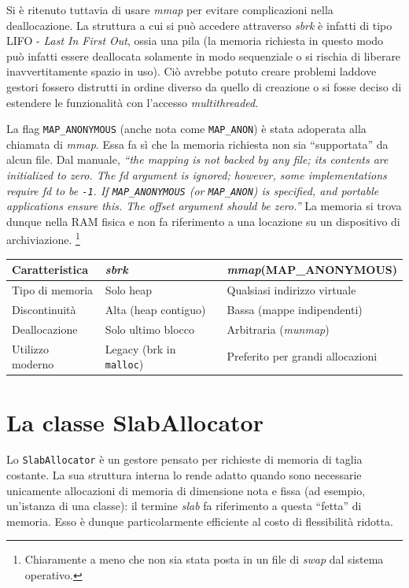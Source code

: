 Si è ritenuto tuttavia di usare \textit{mmap} per evitare complicazioni nella deallocazione. La struttura a cui si può accedere attraverso \textit{sbrk} è infatti di tipo LIFO - \textit{Last In First Out}, ossia una pila (la memoria richiesta in questo modo può infatti essere deallocata solamente in modo sequenziale o si rischia di liberare inavvertitamente spazio in uso). Ciò avrebbe potuto creare problemi laddove gestori fossero distrutti in ordine diverso da quello di creazione o si fosse deciso di estendere le funzionalità con l'accesso \textit{multithreaded}.

La flag \texttt{MAP\_ANONYMOUS} (anche nota come \texttt{MAP\_ANON}) è stata adoperata alla chiamata di \textit{mmap}. Essa fa sì che la memoria richiesta non sia “supportata” da alcun file. Dal manuale, \textit{“the mapping is not backed by any file; its contents are initialized to zero. The fd argument is ignored; however, some implementations require fd to be \texttt{-1}. If \texttt{MAP\_ANONYMOUS} (or \texttt{MAP\_ANON}) is specified, and portable applications ensure this. The offset argument should be zero.”} La memoria si trova dunque nella RAM fisica e non fa riferimento a una locazione su un dispositivo di archiviazione. \footnote{Chiaramente a meno che non sia stata posta in un file di \textit{swap} dal sistema operativo.}

\begin{center}
\begin{tabular}{|l|l|l|}
\hline
Caratteristica & \textit{sbrk} & \textit{mmap}(MAP\_ANONYMOUS) \\
\hline
Tipo di memoria & Solo heap & Qualsiasi indirizzo virtuale \\
Discontinuità & Alta (heap contiguo) & Bassa (mappe indipendenti) \\
Deallocazione & Solo ultimo blocco & Arbitraria (\textit{munmap}) \\
Utilizzo moderno & Legacy (brk in \texttt{malloc}) & Preferito per grandi allocazioni \\
\hline
\end{tabular}
\end{center}


\section{La classe SlabAllocator}
Lo \texttt{SlabAllocator} è un gestore pensato per richieste di memoria di taglia costante. La sua struttura interna lo rende adatto quando sono necessarie unicamente allocazioni di memoria di dimensione nota e fissa (ad esempio, un'istanza di una classe): il termine \textit{slab} fa riferimento a questa “fetta” di memoria. Esso è dunque particolarmente efficiente al costo di flessibilità ridotta.

